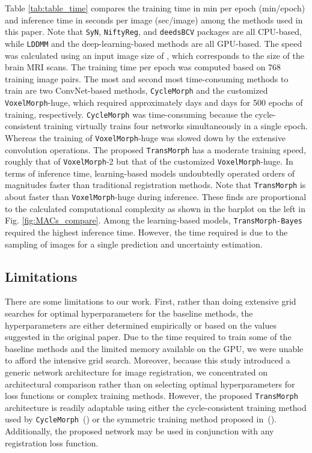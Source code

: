 \documentclass[times,twocolumn,final]{elsarticle}
\begin{document}
Table \ref{tab:table_time} compares the training time in min per epoch (min/epoch) and inference time in seconds per image (sec/image) among the methods used in this paper. Note that  \texttt{SyN}, \texttt{NiftyReg}, and \texttt{deedsBCV} packages are all CPU-based, while \texttt{LDDMM} and the deep-learning-based methods are all GPU-based. The speed was calculated using an input image size of , which corresponds to the size of the brain MRI scans. The training time per epoch was computed based on 768 training image pairs. The most and second most time-consuming methods to train are two ConvNet-based methods, \texttt{CycleMorph} and the customized \texttt{VoxelMorph}-huge, which required approximately  days and  days for 500 epochs of training, respectively. \texttt{CycleMorph} was time-consuming because the cycle-consistent training virtually trains four networks simultaneously in a single epoch. Whereas the training of \texttt{VoxelMorph}-huge was slowed down by the extensive convolution operations. The proposed \texttt{TransMorph} has a moderate training speed, roughly  that of \texttt{VoxelMorph}-2 but  that of the customized \texttt{VoxelMorph}-huge. In terms of inference time, learning-based models undoubtedly operated orders of magnitudes faster than traditional registration methods. Note that \texttt{TransMorph} is about  faster than \texttt{VoxelMorph}-huge during inference. These finds are proportional to the calculated computational complexity as shown in the barplot on the left in Fig. \ref{fig:MACs_compare}. Among the learning-based models, \texttt{TransMorph-Bayes} required the highest inference time. However, the time required is due to the sampling of  images for a single prediction and uncertainty estimation.

\subsection{Limitations}
There are some limitations to our work. First, rather than doing extensive grid searches for optimal hyperparameters for the baseline methods, the hyperparameters are either determined empirically or based on the values suggested in the original paper. Due to the time required to train some of the baseline methods and the limited memory available on the GPU, we were unable to afford the intensive grid search. Moreover, because this study introduced a generic network architecture for image registration, we concentrated on architectural comparison rather than on selecting optimal hyperparameters for loss functions or complex training methods. However, the proposed \texttt{TransMorph} architecture is readily adaptable using either the cycle-consistent training method used by \texttt{CycleMorph}~(\cite{kim2021cyclemorph}) or the symmetric training method proposed in~(\cite{mok2020fast}). Additionally, the proposed network may be used in conjunction with any registration loss function. 
\end{document}
